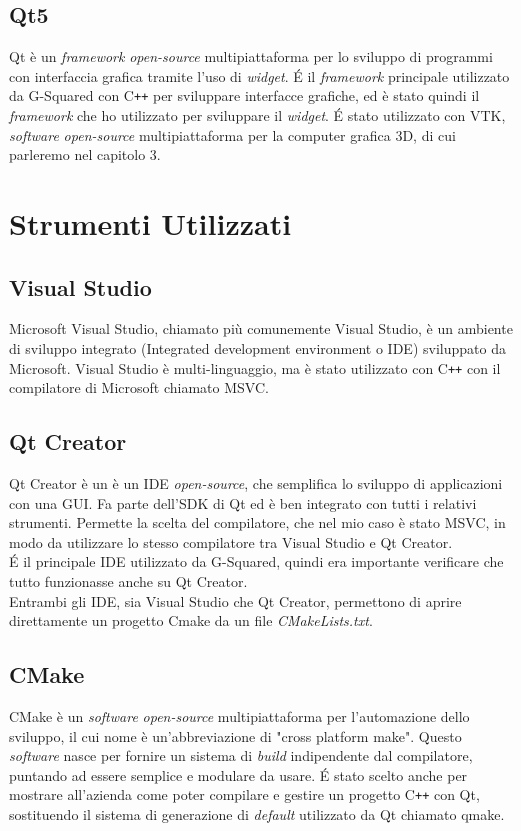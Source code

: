 \subsection{Qt5}\label{sec:Qt5}
Qt è un \emph{framework} \emph{open-source} multipiattaforma per lo sviluppo di programmi con interfaccia grafica tramite l'uso di \emph{widget}.
\'E il \emph{framework} principale utilizzato da G-Squared con C\texttt{++} per sviluppare interfacce grafiche, ed è stato quindi il \emph{framework} che ho utilizzato per sviluppare il \emph{widget}. \'E stato utilizzato con VTK, \emph{software} \emph{open-source} multipiattaforma per la computer grafica 3D, di cui parleremo nel capitolo 3.

\section{Strumenti Utilizzati}
\subsection{Visual Studio}\label{sec:visual-studio}
Microsoft Visual Studio, chiamato più comunemente Visual Studio, è un ambiente di sviluppo integrato (Integrated development environment o IDE) sviluppato da Microsoft.
Visual Studio è multi-linguaggio, ma è stato utilizzato con C\texttt{++} con il compilatore di Microsoft chiamato MSVC.

\subsection{Qt Creator}\label{sec:qt-creator}
Qt Creator è un è un IDE \emph{open-source}, che semplifica lo sviluppo di applicazioni con una GUI. Fa parte dell'SDK di Qt ed è ben integrato con tutti i relativi strumenti. Permette la scelta del compilatore, che nel mio caso è stato MSVC, in modo da utilizzare lo stesso compilatore tra Visual Studio e Qt Creator.
\\
\'E il principale IDE utilizzato da G-Squared, quindi era importante verificare che tutto funzionasse anche su Qt Creator.
\\
Entrambi gli IDE, sia Visual Studio che Qt Creator, permettono di aprire direttamente un progetto Cmake da un file \emph{CMakeLists.txt}.

\subsection{CMake}\label{sec:cmake}
CMake è un \emph{software} \emph{open-source} multipiattaforma per l'automazione dello sviluppo, il cui nome è un'abbreviazione di "cross platform make". Questo \emph{software} nasce per fornire un sistema di \emph{build} indipendente dal compilatore, puntando ad essere semplice e modulare da usare.
\'E stato scelto anche per mostrare all'azienda come poter compilare e gestire un progetto C\texttt{++} con Qt, sostituendo il sistema di generazione di \emph{default} utilizzato da Qt chiamato qmake.

